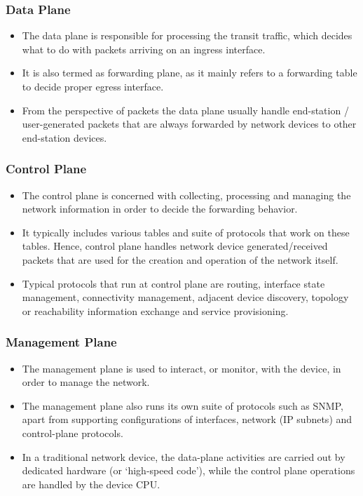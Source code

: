 \documentclass[12pt,letterpaper]{article}
\begin{document}
    \subsubsection{Data Plane}

        \begin{itemize}
            \item The data plane is responsible for processing the transit traffic, which decides what to do with packets arriving on an ingress interface.
            \item  It is also termed as forwarding plane, as it mainly refers to a forwarding table to decide proper egress interface.
            \item  From the perspective of packets the data plane usually handle end-station / user-generated packets that are always forwarded by network devices to other end-station devices.

        \end{itemize}

    \subsubsection{Control Plane}

        \begin{itemize}
            \item The control plane is concerned with collecting, processing and managing the network information in order to decide the forwarding behavior.
            
            \item It typically includes various tables and suite of protocols that work on these tables. Hence, control plane handles network device generated/received packets that are used for the creation and operation of the network itself.
                
            \item Typical protocols that run at control plane are routing, interface state management, connectivity management, adjacent device discovery, topology or reachability information exchange and service provisioning.

        \end{itemize}

    \subsubsection{Management Plane}
        \begin{itemize}
            \item The management plane is used to interact, or monitor, with the device, in order to manage the network.
            \item The management plane also runs its own suite of protocols such as \ac{SNMP}, apart from supporting configurations of interfaces, network (IP subnets) and control-plane protocols.
            \item In a traditional network device, the data-plane activities are carried out by dedicated hardware (or ‘high-speed code’), while the control plane operations are handled by the device CPU.

        \end{itemize}
\end{document}
